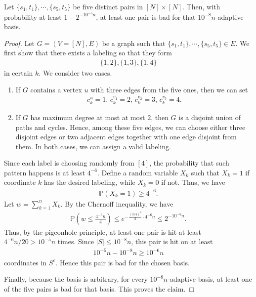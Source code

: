 \begin{claim}
Let $\{s_1,t_1\},\cdots,\{s_5,t_5\}$ be five distinct pairs in $[N]\times[N]$.
Then, with probability at least $1-2^{-10^{-5}n}$, at least one pair is bad for that $10^{-8}n$-adaptive basis.
\end{claim}
\begin{proof}
Let $G=(V=[N],E)$ be a graph such that $\{s_1,t_1\},\cdots,\{s_5,t_5\}\in E$.
We first show that there exists a labeling so that they form 
\begin{align*}
\{1,2\},\{1,3\},\{1,4\}
\end{align*}
in certain $k$.
We consider two cases.
\begin{enumerate}
\item
If $G$ contains a vertex $u$ with three edges from the five ones, then we can set
\begin{align*}
c^u_k=1,\,c^{v_1}_k=2,\,c^{v_2}_k=3,\,c^{v_3}_k=4.
\end{align*}
\item
If $G$ has maximum degree at most at most $2$, then $G$ is a disjoint union of paths and cycles.
Hence, among these five edges, we can choose either three disjoint edges or two adjacent edges together with one edge disjoint from them.
In both cases, we can assign a valid labeling.
\end{enumerate}
Since each label is choosing randomly from $[4]$, the probability that such pattern happens is at least $4^{-6}$.
Define a random variable $X_k$ such that $X_k=1$ if coordinate $k$ has the desired labeling, while $X_k=0$ if not.
Thus, we have
\begin{align*}
\mathbb{P}\left(X_k=1\right)\ge4^{-6}.
\end{align*}
Let $w=\sum_{k=1}^nX_k$.
By the Chernoff inequality, we have
\begin{align*}
\mathbb{P}\left(w\le\frac{4^{-6}n}{4}\right)\le e^{-\frac{(3/4)^2}{2}\cdot4^{-6}n}\le2^{-10^{-5}n}.
\end{align*}
Thus, by the pigeonhole principle, at least one pair is hit at least $4^{-6}n/20>10^{-5}n$ times.
Since $|S|\le10^{-8}n$, this pair is hit on at least
\begin{align*}
10^{-5}n-10^{-8}n\ge10^{-6}n
\end{align*}
coordinates in $S^c$.
Hence this pair is bad for the chosen basis.

Finally, because the basis is arbitrary, for every $10^{-8}n$-adaptive basis, at least one of the five pairs is bad for that basis.
This proves the claim.
\end{proof}

